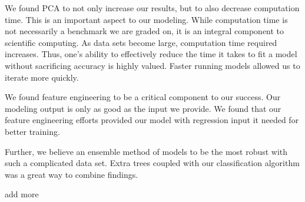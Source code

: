\documentclass[11pt, oneside]{article}   	%
\begin{document}
We found PCA to not only increase our results, but to also decrease computation time. This is an important aspect to our modeling. While computation time is not necessarily a benchmark we are graded on, it is an integral component to scientific computing. As data sets become large, computation time required increases. Thus, one's ability to effectively reduce the time it takes to fit a model without sacrificing accuracy is highly valued. Faster running models allowed us to iterate more quickly.

We found feature engineering to be a critical component to our success. Our modeling output is only as good as the input we provide. We found that our feature engineering efforts provided our model with regression input it needed for better training. 

Further, we believe an ensemble method of models to be the most robust with such a complicated data set. Extra trees coupled with our classification algorithm was a great way to combine findings. 

add more


\end{document}
